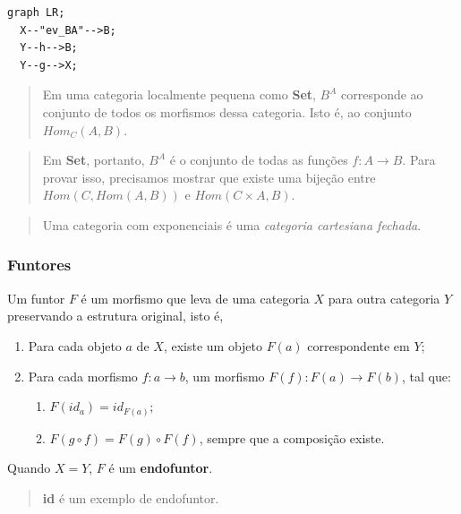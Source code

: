\begin{verbatim}
graph LR;
  X--"ev_BA"-->B;
  Y--h-->B;
  Y--g-->X;
\end{verbatim}

\begin{quote}
Em uma categoria localmente pequena como \textbf{Set}, \(B^A\)
corresponde ao conjunto de todos os morfismos dessa categoria. Isto é,
ao conjunto \(Hom_C(A, B)\).
\end{quote}

\begin{quote}
Em \textbf{Set}, portanto, \(B^A\) é o conjunto de todas as funções
\(f : A \rightarrow B\). Para provar isso, precisamos mostrar que existe
uma bijeção entre \(Hom(C, Hom(A, B))\) e \(Hom(C \times A, B)\).
\end{quote}

\begin{quote}
Uma categoria com exponenciais é uma \emph{categoria cartesiana
fechada}.
\end{quote}

\hypertarget{funtores}{%
\subsubsection{Funtores}\label{funtores}}

Um funtor \(F\) é um morfismo que leva de uma categoria \(X\) para outra
categoria \(Y\) preservando a estrutura original, isto é,

\begin{enumerate}
\def\labelenumi{\arabic{enumi}.}
\tightlist
\item
  Para cada objeto \(a\) de \(X\), existe um objeto \(F(a)\)
  correspondente em \(Y\);
\item
  Para cada morfismo \(f : a \rightarrow b\), um morfismo
  \(F(f) : F(a) \rightarrow F(b)\), tal que:

  \begin{enumerate}
  \def\labelenumii{\arabic{enumii}.}
  \tightlist
  \item
    \(F(id_a) = id_{F(a)}\);
  \item
    \(F(g \circ f) = F(g) \circ F(f)\), sempre que a composição existe.
  \end{enumerate}
\end{enumerate}

Quando \(X = Y\), \(F\) é um \textbf{endofuntor}.

\begin{quote}
\textbf{id} é um exemplo de endofuntor.
\end{quote}


